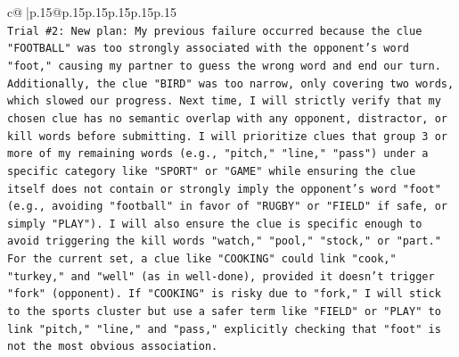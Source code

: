 \documentclass{article}
\begin{document}
{\begin{supertabular}{c@{$\;$}|p{.15\linewidth}@{}p{.15\linewidth}p{.15\linewidth}p{.15\linewidth}p{.15\linewidth}p{.15\linewidth}}
{{{\\ 
\texttt{Trial \#2: New plan: My previous failure occurred because the clue "FOOTBALL" was too strongly associated with the opponent's word "foot," causing my partner to guess the wrong word and end our turn. Additionally, the clue "BIRD" was too narrow, only covering two words, which slowed our progress. Next time, I will strictly verify that my chosen clue has no semantic overlap with any opponent, distractor, or kill words before submitting. I will prioritize clues that group 3 or more of my remaining words (e.g., "pitch," "line," "pass") under a specific category like "SPORT" or "GAME" while ensuring the clue itself does not contain or strongly imply the opponent's word "foot" (e.g., avoiding "football" in favor of "RUGBY" or "FIELD" if safe, or simply "PLAY"). I will also ensure the clue is specific enough to avoid triggering the kill words "watch," "pool," "stock," or "part." For the current set, a clue like "COOKING" could link "cook," "turkey," and "well" (as in well{-}done), provided it doesn't trigger "fork" (opponent). If "COOKING" is risky due to "fork," I will stick to the sports cluster but use a safer term like "FIELD" or "PLAY" to link "pitch," "line," and "pass," explicitly checking that "foot" is not the most obvious association.} \\
\\ 
}}}
\end{supertabular}}
\end{document}
